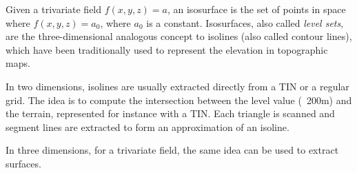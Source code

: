 Given a trivariate field $f(x,y,z) = a$, an isosurface is the set of points in space where $f(x,y,z) = a_0$, where $a_0$ is a constant. 
Isosurfaces, also called \emph{level sets}, 
are the three-dimensional analogous concept to isolines (also called contour lines), which have been traditionally used to represent the elevation in topographic maps.

%

In two dimensions, isolines are usually extracted directly from a TIN or a regular grid. 
The idea is to compute the intersection between the level value (\eg\ 200m) and the terrain, represented for instance with a TIN\@. 
Each triangle is scanned and segment lines are extracted to form an approximation of an isoline.

%

In three dimensions, for a trivariate field, the same idea can be used to extract surfaces.

%

